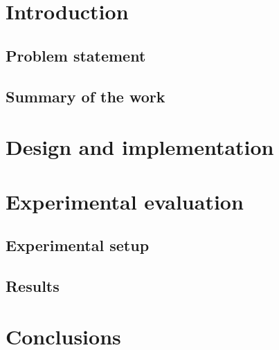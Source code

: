 \section{Introduction}

\subsection{Problem statement}

\subsection{Summary of the work}

\pagebreak

\section{Design and implementation}
\cite{RefManual}

\section{Experimental evaluation}
\subsection{Experimental setup}
\subsection{Results}



\section{Conclusions}

